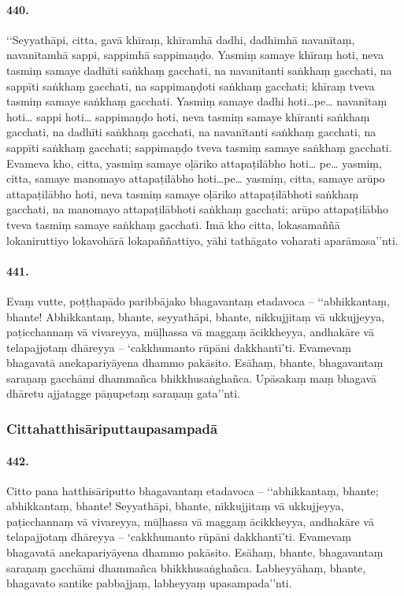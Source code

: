 \paragraph{440.} ‘‘Seyyathāpi, citta, gavā khīraṃ, khīramhā dadhi, dadhimhā navanītaṃ, navanītamhā sappi, sappimhā sappimaṇḍo. Yasmiṃ samaye khīraṃ hoti, neva tasmiṃ samaye dadhīti saṅkhaṃ gacchati, na navanītanti saṅkhaṃ gacchati, na sappīti saṅkhaṃ gacchati, na sappimaṇḍoti saṅkhaṃ gacchati; khīraṃ tveva tasmiṃ samaye saṅkhaṃ gacchati. Yasmiṃ samaye dadhi hoti…pe… navanītaṃ hoti… sappi hoti… sappimaṇḍo hoti, neva tasmiṃ samaye khīranti saṅkhaṃ gacchati, na dadhīti saṅkhaṃ gacchati, na navanītanti saṅkhaṃ gacchati, na sappīti saṅkhaṃ gacchati; sappimaṇḍo tveva tasmiṃ samaye saṅkhaṃ gacchati. Evameva kho, citta, yasmiṃ samaye oḷāriko attapaṭilābho hoti… pe… yasmiṃ, citta, samaye manomayo attapaṭilābho hoti…pe… yasmiṃ, citta, samaye arūpo attapaṭilābho hoti, neva tasmiṃ samaye oḷāriko attapaṭilābhoti saṅkhaṃ gacchati, na manomayo attapaṭilābhoti saṅkhaṃ gacchati; arūpo attapaṭilābho tveva tasmiṃ samaye saṅkhaṃ gacchati. Imā kho citta, lokasamaññā lokaniruttiyo lokavohārā lokapaññattiyo, yāhi tathāgato voharati aparāmasa’’nti.

\paragraph{441.} Evaṃ vutte, poṭṭhapādo paribbājako bhagavantaṃ etadavoca – ‘‘abhikkantaṃ, bhante! Abhikkantaṃ, bhante, seyyathāpi, bhante, nikkujjitaṃ vā ukkujjeyya, paṭicchannaṃ vā vivareyya, mūḷhassa vā maggaṃ ācikkheyya, andhakāre vā telapajjotaṃ dhāreyya – ‘cakkhumanto rūpāni dakkhantī’ti. Evamevaṃ bhagavatā anekapariyāyena dhammo pakāsito. Esāhaṃ, bhante, bhagavantaṃ saraṇaṃ gacchāmi dhammañca bhikkhusaṅghañca. Upāsakaṃ maṃ bhagavā dhāretu ajjatagge pāṇupetaṃ saraṇaṃ gata’’nti.

\subsubsection{Cittahatthisāriputtaupasampadā}

\paragraph{442.} Citto pana hatthisāriputto bhagavantaṃ etadavoca – ‘‘abhikkantaṃ, bhante; abhikkantaṃ, bhante! Seyyathāpi, bhante, nikkujjitaṃ vā ukkujjeyya, paṭicchannaṃ vā vivareyya, mūḷhassa vā maggaṃ ācikkheyya, andhakāre vā telapajjotaṃ dhāreyya – ‘cakkhumanto rūpāni dakkhantī’ti. Evamevaṃ bhagavatā anekapariyāyena dhammo pakāsito. Esāhaṃ, bhante, bhagavantaṃ saraṇaṃ gacchāmi dhammañca bhikkhusaṅghañca. Labheyyāhaṃ, bhante, bhagavato santike pabbajjaṃ, labheyyaṃ upasampada’’nti.

